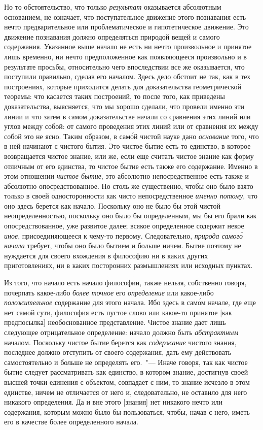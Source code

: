 Но то обстоятельство, что только \emph{результат} оказывается
абсолютным основанием, не означает, что поступательное
движение этого познавания есть нечто предварительное
или проблематическое и гипотетическое движение.
Это движение познавания должно определяться
природой вещей и самого содержания. Указанное выше
начало не есть ни нечто произвольное и принятое лишь
временно, ни нечто предположенное как появляющееся
произвольно и в результате просьбы, относительно чего
впоследствии все же оказывается, что поступили правильно,
сделав его началом. Здесь дело обстоит не так,
как в тех построениях, которые приходится делать для
доказательства геометрической теоремы: что касается таких
построений, то после того, как приведены доказательства,
выясняется, что мы хорошо сделали, что провели
именно эти линии и что затем в самом доказательстве
начали со сравнения этих линий или углов между
собой: от самого проведения этих линий или от сравнения
их между собой это не ясно. Таким образом, в сам\'ой
чистой науке дано \emph{основание} того, что в ней начинают
с чистого бытия. Это чистое бытие есть то единство,
в которое возвращается чистое знание, или же, если еще
считать чистое знание как форму отличным от его единства,
то чистое бытие есть также его содержание. Именно
в этом отношении \emph{чистое бытие}, это абсолютно непосредственное
есть также и абсолютно опосредствованное. Но
столь же существенно, чтобы оно было взято только
в своей односторонности как чисто непосредственное
\emph{именно потому}, что оно здесь берется как начало. Поскольку
оно не было бы этой чистой неопределенностью,
поскольку оно было бы определенным, мы бы его брали
как опосредствованное, уже развитое далее; всякое определенное
содержит некое \emph{иное}, присоединяющееся к чему-то
первому. Следовательно, \emph{природа самог\'о начала} требует,
чтобы оно было бытием и больше ничем. Бытие
поэтому не нуждается для своего вхождения в философию
ни в каких других приготовлениях, ни в каких посторонних
размышлениях или исходных пунктах.

Из того, что начало есть начало философии, также
нельзя, собственно говоря, почерпать какое-либо \emph{более
точное} его \emph{определение} или какое-либо \emph{положительное}
содержание для этого начала. Ибо здесь в сам\'ом начале,
где еще нет самой сути, философия есть пустое слово или
какое-то принятое [как предпосылка] необоснованное
представление. Чистое знание дает лишь следующее отрицательное
определение: начало должно быть \emph{абстрактным}
началом. Поскольку чистое бытие берется как \emph{содержание}
чистого знания, последнее должно отступить
от своего содержания, дать ему действовать самостоятельно
и больше не определять его.~"--- Иначе говоря, так как
чистое бытие следует рассматривать как единство, в котором
знание, достигнув своей высшей точки единения
с объектом, совпадает с ним, то знание исчезло в этом
единстве, ничем не отличается от него и, следовательно,
не оставило для него никакого определения. Да и вне
этого [знания] нет никакого нечто или содержания, которым
можно было бы пользоваться, чтобы, начав с него,
иметь его в качестве более определенного начала.

